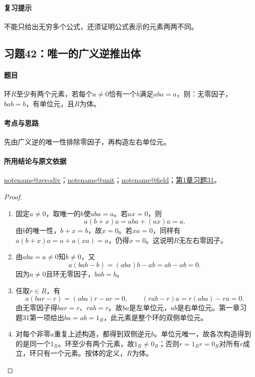 \documentclass[UTF8,a4paper,11pt,fontset=windows]{ctexart}
\makeatletter
\newcommand{\noteref}[1]{\hyperref[note:#1]{\csname notename@#1\endcsname}}
\newcommand{\exref}[2]{\hyperref[ex:#1:#2]{第#1章习题#2}}
\makeatother
\begin{document}
\paragraph{复习提示}
不能只给出无穷多个公式，还须证明公式表示的元素两两不同。


\subsection{习题42：\texorpdfstring{唯一的广义逆推出体}{唯一的广义逆推出体}}
\label{ex:1:42}

\paragraph{题目}
环$R$至少有两个元素，若每个$a\neq0$恰有一个$b$满足$aba=a$，则：无零因子，$bab=b$，有单位元，且$R$为体。

\paragraph{考点与思路}
先由广义逆的唯一性排除零因子，再构造左右单位元。

\paragraph{所用结论与原文依据}
\noteref{zerodiv}；\noteref{unit}；\noteref{field}；\exref{1}{31}。


\begin{proof}
\begin{enumerate}
\item 固定$a\ne0$，取唯一的$b$使$aba=a$。若$ax=0$，则
\[
a(b+x)a=aba+(ax)a=a.
\]
由$b$的唯一性，$b+x=b$，故$x=0$。若$xa=0$，同样有$a(b+x)a=a+a(xa)=a$，仍得$x=0$。这说明$R$无左右零因子。

\item 由$aba=a\ne0$知$b\ne0$，又
\[
a(bab-b)=(aba)b-ab=ab-ab=0.
\]
因为$a\ne0$且环无零因子，$bab=b$。

\item 任取$r\in R$，有
\[
a(bar-r)=(aba)r-ar=0,\qquad
(rab-r)a=r(aba)-ra=0.
\]
由无零因子得$bar=r$、$rab=r$。故$ba$是左单位元，$ab$是右单位元。第一章习题31第一项给出$ba=ab=1_R$，此元素是整个环的双侧单位元。

\item 对每个非零$a$重复上述构造，都得到双侧逆元$b$。单位元唯一，故各次构造得到的是同一个$1_R$。环至少有两个元素，故$1_R\ne0_R$；否则$r=1_Rr=0_R$对所有$r$成立，环只有一个元素。按体的定义，$R$为体。
\end{enumerate}
\end{proof}
\end{document}
